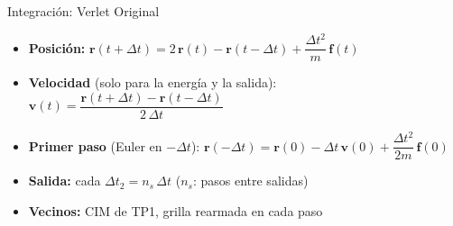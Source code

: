 \documentclass[aspectratio=43,11pt]{beamer}
\begin{document}
\begin{frame}{Integración: Verlet Original}
  \begin{itemize}
    \item \textbf{Posición:} $\mathbf{r}(t+\Delta t) = 2\,\mathbf{r}(t) - \mathbf{r}(t-\Delta t) + \dfrac{\Delta t^2}{m}\,\mathbf{f}(t)$
    \item \textbf{Velocidad} (solo para la energía y la salida): $\mathbf{v}(t) = \dfrac{\mathbf{r}(t+\Delta t) - \mathbf{r}(t-\Delta t)}{2\,\Delta t}$
    \item \textbf{Primer paso} (Euler en $-\Delta t$): $\mathbf{r}(-\Delta t) = \mathbf{r}(0) - \Delta t\,\mathbf{v}(0) + \dfrac{\Delta t^2}{2m}\,\mathbf{f}(0)$
    \item \textbf{Salida:} cada $\Delta t_2 = n_s\,\Delta t$ ($n_s$: pasos entre salidas)
    \item \textbf{Vecinos:} CIM de TP1, grilla rearmada en cada paso
  \end{itemize}
\end{frame}
\end{document}
